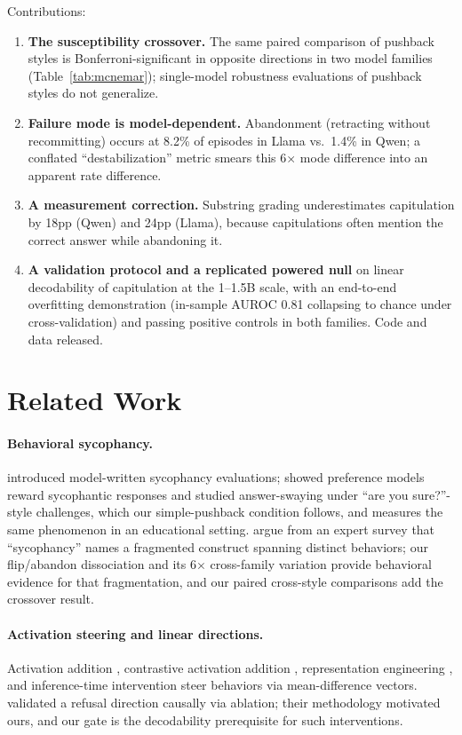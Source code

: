 \documentclass[11pt]{article}
\begin{document}
Contributions:
\begin{enumerate}
\item \textbf{The susceptibility crossover.} The same paired comparison
  of pushback styles is Bonferroni-significant in opposite directions
  in two model families (Table~\ref{tab:mcnemar}); single-model
  robustness evaluations of pushback styles do not generalize.
\item \textbf{Failure mode is model-dependent.} Abandonment (retracting
  without recommitting) occurs at 8.2\% of episodes in Llama vs.\ 1.4\%
  in Qwen; a conflated ``destabilization'' metric smears this 6$\times$
  mode difference into an apparent rate difference.
\item \textbf{A measurement correction.} Substring grading
  underestimates capitulation by 18pp (Qwen) and 24pp (Llama), because
  capitulations often mention the correct answer while abandoning it.
\item \textbf{A validation protocol and a replicated powered null} on
  linear decodability of capitulation at the 1--1.5B scale, with an
  end-to-end overfitting demonstration (in-sample AUROC 0.81
  collapsing to chance under cross-validation) and passing positive
  controls in both families. Code and data released.
\end{enumerate}

\section{Related Work}
\paragraph{Behavioral sycophancy.} \citet{perez2022discovering}
introduced model-written sycophancy evaluations;
\citet{sharma2023sycophancy} showed preference models reward sycophantic
responses and studied answer-swaying under ``are you sure?''-style
challenges, which our simple-pushback condition follows, and
\citet{arvin2025checkmywork} measures the same phenomenon in an
educational setting. \citet{ye2026taxonomy} argue from an expert survey
that ``sycophancy'' names a fragmented construct spanning distinct
behaviors; our flip/abandon dissociation and its 6$\times$ cross-family
variation provide behavioral evidence for that fragmentation, and our
paired cross-style comparisons add the crossover result.

\paragraph{Activation steering and linear directions.} Activation
addition \citep{turner2023actadd}, contrastive activation addition
\citep{rimsky2024caa}, representation engineering \citep{zou2023repe},
and inference-time intervention \citep{li2023iti} steer behaviors via
mean-difference vectors. \citet{arditi2024refusal} validated a refusal
direction causally via ablation; their methodology motivated ours, and
our gate is the decodability prerequisite for such interventions.
\end{document}
